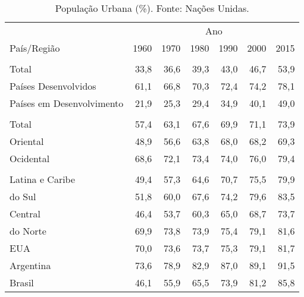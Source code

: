 \documentclass[a4paper, 12pt]{article}
\begin{document}
\begin{table}[!h]

\caption{\label{tab:unnamed-chunk-2}População Urbana (\%). Fonte: Nações Unidas.}
\centering
\begin{tabular}{lrrrrrr}
\toprule
\multicolumn{1}{c}{} & \multicolumn{6}{c}{Ano} \\
\cmidrule(l{3pt}r{3pt}){2-7}
País/Região & 1960 & 1970 & 1980 & 1990 & 2000 & 2015\\
\midrule
\rowcolor{gray!6}  \addlinespace[0.3em]
\multicolumn{7}{l}{\textbf{Mundo}}\\
\hspace{1em}Total & 33,8 & 36,6 & 39,3 & 43,0 & 46,7 & 53,9\\
\hspace{1em}Países Desenvolvidos & 61,1 & 66,8 & 70,3 & 72,4 & 74,2 & 78,1\\
\hspace{1em}Países em Desenvolvimento & 21,9 & 25,3 & 29,4 & 34,9 & 40,1 & 49,0\\
\rowcolor{gray!6}  \addlinespace[0.3em]
\multicolumn{7}{l}{\textbf{Europa}}\\
\hspace{1em}Total & 57,4 & 63,1 & 67,6 & 69,9 & 71,1 & 73,9\\
\hspace{1em}Oriental & 48,9 & 56,6 & 63,8 & 68,0 & 68,2 & 69,3\\
\hspace{1em}Ocidental & 68,6 & 72,1 & 73,4 & 74,0 & 76,0 & 79,4\\
\rowcolor{gray!6}  \addlinespace[0.3em]
\multicolumn{7}{l}{\textbf{América}}\\
\hspace{1em}Latina e Caribe & 49,4 & 57,3 & 64,6 & 70,7 & 75,5 & 79,9\\
\hspace{1em}do Sul & 51,8 & 60,0 & 67,6 & 74,2 & 79,6 & 83,5\\
\hspace{1em}Central & 46,4 & 53,7 & 60,3 & 65,0 & 68,7 & 73,7\\
\hspace{1em}do Norte & 69,9 & 73,8 & 73,9 & 75,4 & 79,1 & 81,6\\
\hspace{1em}EUA & 70,0 & 73,6 & 73,7 & 75,3 & 79,1 & 81,7\\
\hspace{1em}Argentina & 73,6 & 78,9 & 82,9 & 87,0 & 89,1 & 91,5\\
\hspace{1em}Brasil & 46,1 & 55,9 & 65,5 & 73,9 & 81,2 & 85,8\\
\bottomrule
\end{tabular}
\end{table}
\end{document}
